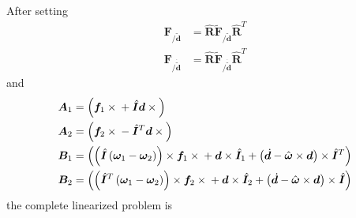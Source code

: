 \documentclass[10pt,fleqn,subeqn]{report}
\newcommand{\T}[1]{\bm{#1}}
\newcommand{\TT}[1]{\bm{#1}}
\begin{document}
After setting
\begin{subequations}
\begin{align}
	\T{F}_{/\tilde{\T{d}}} &=
		\hat{\T{R}} \tilde{\T{F}}_{/\tilde{\T{d}}} \hat{\T{R}}^T \\
	\T{F}_{/\dot{\tilde{\T{d}}}} &=
		\hat{\T{R}} \tilde{\T{F}}_{/\dot{\tilde{\T{d}}}} \hat{\T{R}}^T
\end{align}
\end{subequations}
and
\begin{subequations}
\label{sec:deformable-displacement-joint-invariant-linearization-helpers}
\begin{align}
	\TT{A}_1 &= \plbr{\T{f}_1\times{} + \hat{\TT{I}}\T{d}\times{}} \\
	\TT{A}_2 &= \plbr{\T{f}_2\times{} - \hat{\TT{I}}^T\T{d}\times{}} \\
	\TT{B}_1 &= \plbr{
			\plbr{\hat{\T{I}}\plbr{\T{\omega}_1 - \T{\omega}_2}}\times\T{f}_1\times{}
			+ \T{d}\times\hat{\T{I}}_1
			+ \plbr{\dot{\T{d}} - \hat{\T{\omega}}\times\T{d}}\times\hat{\T{I}}^T
		} \\
	\TT{B}_2 &= \plbr{
			\plbr{\hat{\T{I}}^T\plbr{\T{\omega}_1 - \T{\omega}_2}}\times\T{f}_2\times{}
			+ \T{d}\times\hat{\T{I}}_2
			+ \plbr{\dot{\T{d}} - \hat{\T{\omega}}\times\T{d}}\times\hat{\T{I}}
		}
\end{align}
\end{subequations}
the complete linearized problem is
\end{document}
